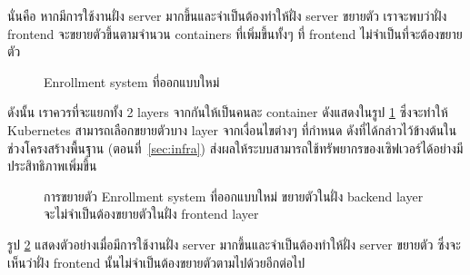 %
นั่นคือ หากมีการใช้งานฝั่ง server มากขึ้นและจำเป็นต้องทำให้ฝั่ง server ขยายตัว เราจะพบว่าฝั่ง frontend จะขยายตัวขึ้นตามจำนวน containers ที่เพิ่มขึ้นทั้งๆ ที่ frontend ไม่จำเป็นที่จะต้องขยายตัว

\begin{figure}
    \centering
    \begin{center}
    \end{center}
    \caption{Enrollment system ที่ออกแบบใหม่}
    \label{fig:new_regist_system}
\end{figure}
%
ดังนั้น เราควรที่จะแยกทั้ง 2 layers จากกันให้เป็นคนละ container ดังแสดงในรูป \ref{fig:new_regist_system} ซึ่งจะทำให้ Kubernetes สามารถเลือกขยายตัวบาง layer จากเงื่อนไขต่างๆ ที่กำหนด ดังที่ได้กล่าวไว้ข้างต้นในช่วงโครงสร้างพื้นฐาน (ตอนที่~\ref{sec:infra}) ส่งผลให้ระบบสามารถใช้ทรัพยากรของเซิฟเวอร์ได้อย่างมีประสิทธิภาพเพิ่มขึ้น
%
\begin{figure}
    \centering
    \begin{center}
    \end{center}
    \caption{การขยายตัว Enrollment system ที่ออกแบบใหม่ ขยายตัวในฝั่ง backend layer จะไม่จำเป็นต้องขยายตัวในฝั่ง frontend layer}
    \label{fig:scaling_new_regist_system}
\end{figure}
%
รูป \ref{fig:scaling_new_regist_system} แสดงตัวอย่างเมื่อมีการใช้งานฝั่ง server มากขึ้นและจำเป็นต้องทำให้ฝั่ง server ขยายตัว ซึ่งจะเห็นว่าฝั่ง frontend นั้นไม่จำเป็นต้องขยายตัวตามไปด้วยอีกต่อไป


